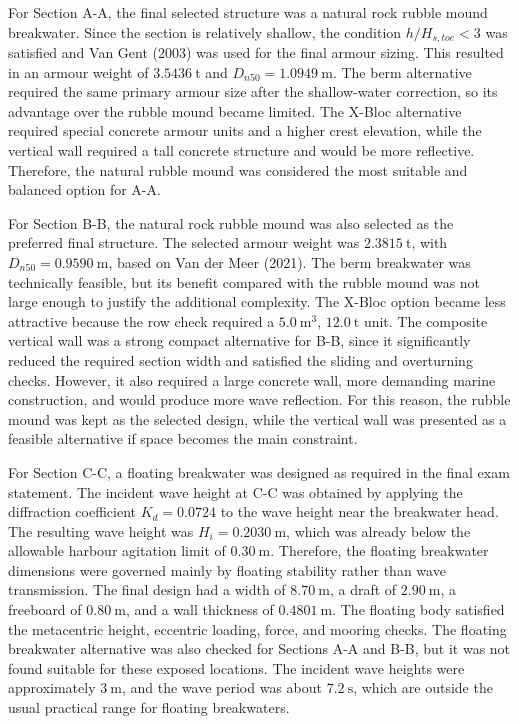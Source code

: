 \documentclass[a4paper, 11pt]{article}
\begin{document}
For Section A-A, the final selected structure was a natural rock rubble mound breakwater. Since the section is relatively shallow, the condition \(h/H_{s,toe}<3\) was satisfied and Van Gent (2003) was used for the final armour sizing. This resulted in an armour weight of \(3.5436~\mathrm{t}\) and \(D_{n50}=1.0949~\mathrm{m}\). The berm alternative required the same primary armour size after the shallow-water correction, so its advantage over the rubble mound became limited. The X-Bloc alternative required special concrete armour units and a higher crest elevation, while the vertical wall required a tall concrete structure and would be more reflective. Therefore, the natural rubble mound was considered the most suitable and balanced option for A-A.

For Section B-B, the natural rock rubble mound was also selected as the preferred final structure. The selected armour weight was \(2.3815~\mathrm{t}\), with \(D_{n50}=0.9590~\mathrm{m}\), based on Van der Meer (2021). The berm breakwater was technically feasible, but its benefit compared with the rubble mound was not large enough to justify the additional complexity. The X-Bloc option became less attractive because the row check required a \(5.0~\mathrm{m^3}\), \(12.0~\mathrm{t}\) unit. The composite vertical wall was a strong compact alternative for B-B, since it significantly reduced the required section width and satisfied the sliding and overturning checks. However, it also required a large concrete wall, more demanding marine construction, and would produce more wave reflection. For this reason, the rubble mound was kept as the selected design, while the vertical wall was presented as a feasible alternative if space becomes the main constraint.

For Section C-C, a floating breakwater was designed as required in the final exam statement. The incident wave height at C-C was obtained by applying the diffraction coefficient \(K_d=0.0724\) to the wave height near the breakwater head. The resulting wave height was \(H_i=0.2030~\mathrm{m}\), which was already below the allowable harbour agitation limit of \(0.30~\mathrm{m}\). Therefore, the floating breakwater dimensions were governed mainly by floating stability rather than wave transmission. The final design had a width of \(8.70~\mathrm{m}\), a draft of \(2.90~\mathrm{m}\), a freeboard of \(0.80~\mathrm{m}\), and a wall thickness of \(0.4801~\mathrm{m}\). The floating body satisfied the metacentric height, eccentric loading, force, and mooring checks. The floating breakwater alternative was also checked for Sections A-A and B-B, but it was not found suitable for these exposed locations. The incident wave heights were approximately \(3~\mathrm{m}\), and the wave period was about \(7.2~\mathrm{s}\), which are outside the usual practical range for floating breakwaters.
\end{document}
